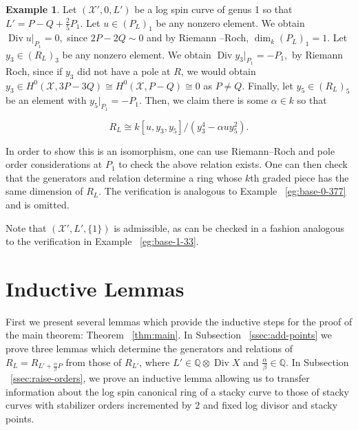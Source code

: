 \documentclass{amsart}
\theoremstyle{plain}
\theoremstyle{definition}
\newtheorem{example}[thm]{Example}
\theoremstyle{remark}
\numberwithin{equation}{section}
\newcommand\BQ{{\mathbb Q}}
\DeclareMathOperator\di{Div}
\newcommand\sx{\mathscr X}
\newcommand{\halfcan}{L}
\begin{document}
\begin{example}
\label{eg:exception-1-5}
Let $(\sx', 0, L')$ be a log spin curve of genus 1 so that $L' = P -
 Q + \frac{2}{5} P_1.$ Let $u \in (P_L)_1$ be any nonzero element.
We obtain $\di u|_{P_1} = 0,$ since $2P - 2Q \sim 0$ and by Riemann
--Roch, $\dim_k (P_L)_1 = 1.$ Let $y_3 \in (R_\halfcan)_3$ be any nonzero
element. We obtain $\di y_3|_{P_1} = - P_1,$ by Riemann Roch, since
if $y_3$ did not have a pole at $R$, we would obtain $y_3 \in H^0
(\sx,3P-3Q) \cong H^0(\sx, P - Q) \cong 0$ as $P \neq Q$. Finally,
let $y_5 \in (R_\halfcan)_5$ be an element with $y_5|_{P_1} = -P_1$. Then,
we claim there is some $\alpha \in k$ so that

$$R_\halfcan \cong k[u, y_3, y_5]/(y_3^4 - \alpha u y_5^2).$$

In order to show this is an isomorphism, one can use Riemann--Roch and pole order considerations at $P_1$ to check the above relation exists. One can then check that the generators and relation determine a ring whose $k$th graded piece has the same dimension of $R_\halfcan$. The verification is analogous to Example ~\ref{eg:base-0-377} and is omitted.

Note that $(\sx', \halfcan', \{1\})$ is admissible, as can be checked in a fashion analogous to the verification in Example ~\ref{eg:base-1-33}.
\end{example}




\section{Inductive Lemmas}
\label{sec:induction}
First we present several lemmas which provide the inductive steps
for the proof of the main theorem: Theorem ~\ref{thm:main}. In
Subsection ~\ref{ssec:add-points} we prove three lemmas which
determine the generators and relations of $R_\halfcan = R_{\halfcan'
+ \frac{\alpha }{\beta}P}$ from those of $R_{\halfcan'}$, where
$\halfcan' \in \BQ \otimes \di X$ and $\frac{\alpha}{\beta} \in \BQ$. 
In Subsection ~\ref{ssec:raise-orders}, we prove an inductive lemma
allowing us to transfer information about the log spin canonical 
ring of a stacky curve to those of stacky curves with stabilizer
orders incremented by $2$ and fixed log divisor and stacky points.

\end{document}
